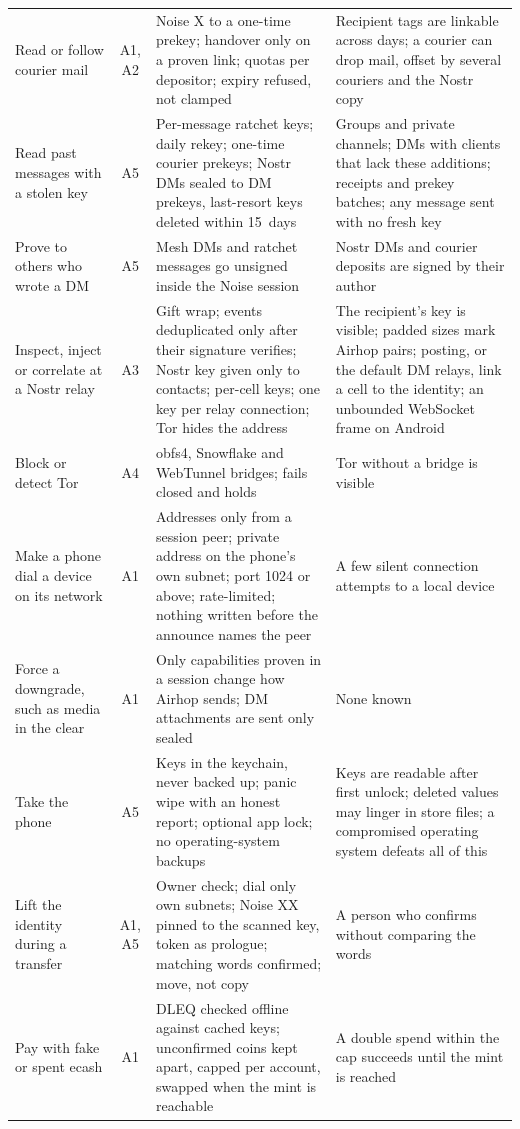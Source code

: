 \documentclass[conference]{IEEEtran}
\begin{document}
\begin{table}[t]
\begin{tabular}{@{}L{3.3cm}cL{7.3cm}L{5.0cm}@{}}
Read or follow courier mail & A1, A2 & Noise X to a one-time prekey; handover only on a proven link; quotas per depositor; expiry refused, not clamped & Recipient tags are linkable across days; a courier can drop mail, offset by several couriers and the Nostr copy \\
Read past messages with a stolen key & A5 & Per-message ratchet keys; daily rekey; one-time courier prekeys; Nostr DMs sealed to DM prekeys, last-resort keys deleted within 15~days & Groups and private channels; DMs with clients that lack these additions; receipts and prekey batches; any message sent with no fresh key \\
Prove to others who wrote a DM & A5 & Mesh DMs and ratchet messages go unsigned inside the Noise session & Nostr DMs and courier deposits are signed by their author \\
Inspect, inject or correlate at a Nostr relay & A3 & Gift wrap; events deduplicated only after their signature verifies; Nostr key given only to contacts; per-cell keys; one key per relay connection; Tor hides the address & The recipient's key is visible; padded sizes mark Airhop pairs; posting, or the default DM relays, link a cell to the identity; an unbounded WebSocket frame on Android \\
Block or detect Tor & A4 & obfs4, Snowflake and WebTunnel bridges; fails closed and holds & Tor without a bridge is visible \\
Make a phone dial a device on its network & A1 & Addresses only from a session peer; private address on the phone's own subnet; port 1024 or above; rate-limited; nothing written before the announce names the peer & A few silent connection attempts to a local device \\
Force a downgrade, such as media in the clear & A1 & Only capabilities proven in a session change how Airhop sends; DM attachments are sent only sealed & None known \\
Take the phone & A5 & Keys in the keychain, never backed up; panic wipe with an honest report; optional app lock; no operating-system backups & Keys are readable after first unlock; deleted values may linger in store files; a compromised operating system defeats all of this \\
Lift the identity during a transfer & A1, A5 & Owner check; dial only own subnets; Noise XX pinned to the scanned key, token as prologue; matching words confirmed; move, not copy & A person who confirms without comparing the words \\
Pay with fake or spent ecash & A1 & DLEQ checked offline against cached keys; unconfirmed coins kept apart, capped per account, swapped when the mint is reachable & A double spend within the cap succeeds until the mint is reached \\
\bottomrule
\end{tabular}
\end{table}
\end{document}
